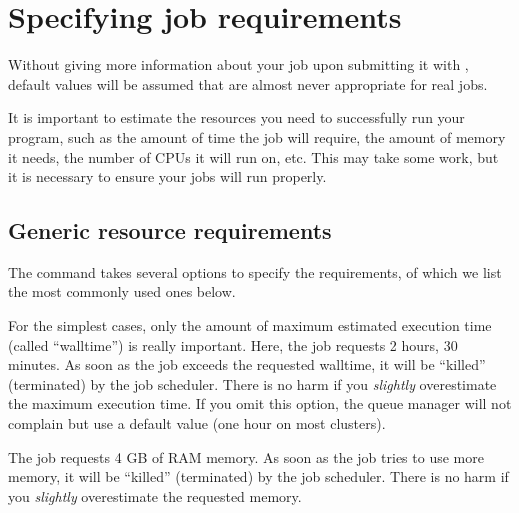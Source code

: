 \section{Specifying job requirements}

Without giving more information about your job upon submitting it with
, default values will be assumed that are almost never appropriate
for real jobs.

It is important to estimate the resources you need to successfully run your
program, such as the amount of time the job will require, the amount of memory
it needs, the number of CPUs it will run on, etc. This may take some work, but
it is necessary to ensure your jobs will run properly.

\subsection{Generic resource requirements}
\label{subsec:generic-resource-requirements}

The  command takes several options to specify the requirements, of which we
list the most commonly used ones below. \\

\begin{prompt}
\end{prompt}

For the simplest cases, only the amount of maximum estimated execution time
(called ``walltime'') is really important. Here, the job requests
2 hours, 30 minutes. As soon as the job exceeds the requested walltime,
it will be ``killed'' (terminated) by the job scheduler.  There is no
harm if you \emph{slightly} overestimate the maximum execution time.
If you omit this option, the queue manager will not complain but use a
default value (one hour on most clusters).

\begin{prompt}
\end{prompt}

The job requests 4 GB of RAM memory. As soon as the job tries to use more memory,
it will be ``killed'' (terminated) by the job scheduler.  There is no
harm if you \emph{slightly} overestimate the requested memory. \\
 \\

\begin{prompt}
\end{prompt}

